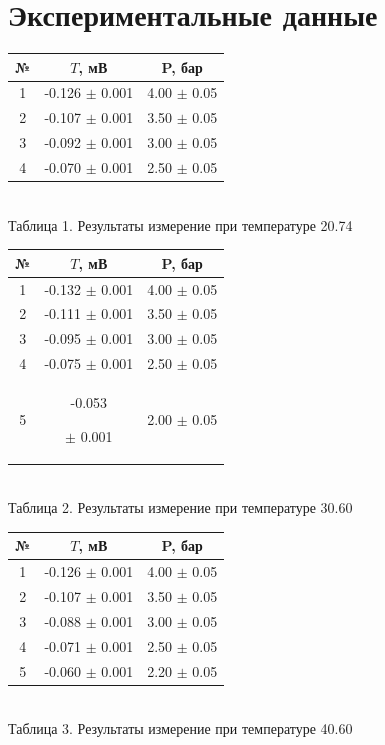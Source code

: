 \documentclass[a4paper, 12pt]{article}
\begin{document}
	\section{Экспериментальные данные}
	\begin{center}
		\begin{tabular} {|c | c |c |}
			\hline	
			№ & $T$, мВ &  P, бар \\
			\hline
			1 & -0.126 $\pm$ 0.001 & 4.00 $\pm$ 0.05  \\
			\hline
			2 &-0.107	$\pm$ 0.001 & 3.50 $\pm$ 0.05  \\
			\hline
			3 & -0.092 $\pm$ 0.001 & 3.00 $\pm$ 0.05 \\
			\hline
			4 &-0.070 $\pm$ 0.001 &2.50  $\pm$ 0.05   \\
			\hline
		\end{tabular}\\
		Таблица 1. Результаты измерение при температуре 20.74 \textcelsius
	\end{center}

	\begin{center}
	\begin{tabular} {|c | c |c |}
		\hline	
		№ & $T$, мВ &  P, бар \\
		\hline
		1 & -0.132
		$\pm$ 0.001 & 4.00 $\pm$ 0.05  \\
		\hline
		2 &-0.111
		$\pm$ 0.001 & 3.50 $\pm$ 0.05  \\
		\hline
		3 &-0.095
		$\pm$ 0.001 & 3.00 $\pm$ 0.05  \\
		\hline
		4 & -0.075
		$\pm$ 0.001 & 2.50 $\pm$ 0.05  \\
		\hline
		5 & -0.053
		
		$\pm$ 0.001 & 2.00 $\pm$ 0.05  \\
		\hline
	\end{tabular}\\
	Таблица 2. Результаты измерение при температуре 30.60 \textcelsius
\end{center}

	\begin{center}
	\begin{tabular} {|c | c |c |}
		\hline	
			№ & $T$, мВ &  P, бар \\
		\hline
		1 &-0.126 $\pm$ 0.001 & 4.00 $\pm$ 0.05  \\
		\hline
		2 &-0.107 $\pm$ 0.001 & 3.50 $\pm$ 0.05  \\
		\hline
		3 & -0.088  $\pm$ 0.001 & 3.00 $\pm$ 0.05  \\
		\hline
		4 &-0.071 $\pm$ 0.001 & 2.50 $\pm$ 0.05  \\
		\hline
		5 &-0.060 $\pm$ 0.001 & 2.20 $\pm$ 0.05  \\
		\hline
	\end{tabular}\\
	Таблица 3. Результаты измерение при температуре 40.60 \textcelsius
\end{center}
\end{document}
